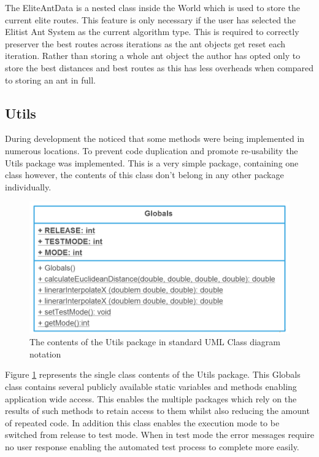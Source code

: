 The EliteAntData is a nested class inside the World which is used to store the current elite routes. This feature is only necessary if the user has selected the Elitist Ant System as the current algorithm type. This is required to correctly preserver the best routes across iterations as the ant objects get reset each iteration. Rather than storing a whole ant object the author has opted only to store the best distances and best routes as this has less overheads when compared to storing an ant in full.

\subsection{Utils}

During development the noticed that some methods were being implemented in numerous locations. To prevent code duplication and promote re-usability the Utils package was implemented. This is a very simple package, containing one class however, the contents of this class don't belong in any other package individually.

\begin{figure}[H]
\centering
\includegraphics[scale=0.3]{Images/chapter4/gloabls}
\caption[Utils Package Class Diagram]{The contents of the Utils package in standard UML Class diagram notation}
\label{fig:utilsImp}
\end{figure}

Figure \ref{fig:utilsImp} represents the single class contents of the Utils package. This Globals class contains several publicly available static variables and methods enabling application wide access. This enables the multiple packages which rely on the results of such methods to retain access to them whilst also reducing the amount of repeated code. In addition this class enables the execution mode to be switched from release to test mode. When in test mode the error messages require no user response enabling the automated test process to complete more easily.

